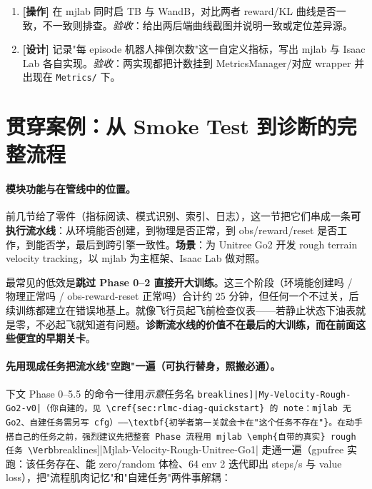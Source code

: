 \begin{practice}[本节动手任务]
\begin{enumerate}
  \item \textbf{[操作]} 在 mjlab 同时启 TB 与 WandB，对比两者 reward/KL 曲线是否一致，不一致则排查。\emph{验收}：给出两后端曲线截图并说明一致或定位差异源。
  \item \textbf{[设计]} 记录"每 episode 机器人摔倒次数"这一自定义指标，写出 mjlab 与 Isaac Lab 各自实现。\emph{验收}：两实现都把计数挂到 MetricsManager/对应 wrapper 并出现在 \verb|Metrics/| 下。
\end{enumerate}
\end{practice}

\section{贯穿案例：从 Smoke Test 到诊断的完整流程}
\label{sec:rlmc-diag-walkthrough}

\paragraph{模块功能与在管线中的位置。}前几节给了零件（指标阅读、模式识别、索引、日志），这一节把它们串成一条\textbf{可执行流水线}：从环境能否创建，到物理是否正常，到 obs/reward/reset 是否工作，到能否学，最后到跨引擎一致性。\textbf{场景}：为 Unitree Go2 开发 rough terrain velocity tracking，以 mjlab 为主框架、Isaac Lab 做对照。

\begin{insight}\label{ins:rlmc-diag-phases}
最常见的低效是\textbf{跳过 Phase 0--2 直接开大训练}。这三个阶段（环境能创建吗 / 物理正常吗 / obs-reward-reset 正常吗）合计约 25 分钟，但任何一个不过关，后续训练都建立在错误地基上。就像飞行员起飞前检查仪表——若静止状态下油表就是零，不必起飞就知道有问题。\textbf{诊断流水线的价值不在最后的大训练，而在前面这些便宜的早期关卡}。
\end{insight}

\paragraph{先用现成任务把流水线"空跑"一遍（可执行替身，照搬必通）。}下文 Phase 0--5.5 的命令一律用\emph{示意}任务名 \Verb[breaklines]|My-Velocity-Rough-Go2-v0|（你自建的，见 \cref{sec:rlmc-diag-quickstart} 的 note：mjlab 无 Go2、自建任务需另写 cfg）——\textbf{初学者第一关就会卡在"这个任务不存在"}。在动手搭自己的任务之前，强烈建议先把整套 Phase 流程用 mjlab \emph{自带的真实} rough 任务 \Verb[breaklines]|Mjlab-Velocity-Rough-Unitree-Go1| 走通一遍（gpufree 实跑：该任务存在、能 zero/random 体检、64 env 2 迭代即出 steps/s 与 value loss），把"流程肌肉记忆"和"自建任务"两件事解耦：

